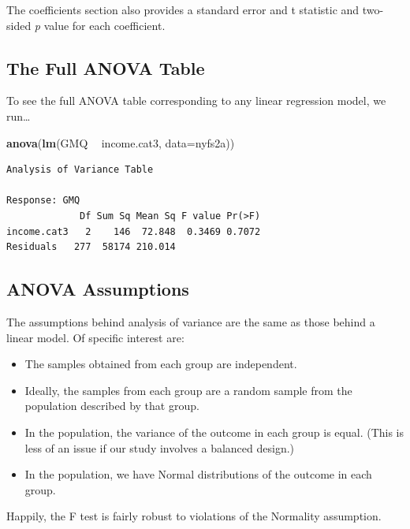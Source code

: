\documentclass[
]{book}
\newenvironment{Shaded}{\begin{snugshade}}{\end{snugshade}}
\newcommand{\DataTypeTok}[1]{\textcolor[rgb]{0.13,0.29,0.53}{#1}}
\newcommand{\KeywordTok}[1]{\textcolor[rgb]{0.13,0.29,0.53}{\textbf{#1}}}
\newcommand{\NormalTok}[1]{#1}
\newcommand{\OperatorTok}[1]{\textcolor[rgb]{0.81,0.36,0.00}{\textbf{#1}}}
\newcommand{\StringTok}[1]{\textcolor[rgb]{0.31,0.60,0.02}{#1}}
\providecommand{\tightlist}{%
  \setlength{\itemsep}{0pt}\setlength{\parskip}{0pt}}
\begin{document}
The coefficients section also provides a standard error and t statistic and two-sided \emph{p} value for each coefficient.

\hypertarget{the-full-anova-table}{%
\subsection{The Full ANOVA Table}\label{the-full-anova-table}}

To see the full ANOVA table corresponding to any linear regression model, we run\ldots{}

\begin{Shaded}
\begin{Highlighting}[]
\KeywordTok{anova}\NormalTok{(}\KeywordTok{lm}\NormalTok{(GMQ }\OperatorTok{~}\StringTok{ }\NormalTok{income.cat3, }\DataTypeTok{data=}\NormalTok{nyfs2a))}
\end{Highlighting}
\end{Shaded}

\begin{verbatim}
Analysis of Variance Table

Response: GMQ
             Df Sum Sq Mean Sq F value Pr(>F)
income.cat3   2    146  72.848  0.3469 0.7072
Residuals   277  58174 210.014               
\end{verbatim}

\hypertarget{anova-assumptions}{%
\subsection{ANOVA Assumptions}\label{anova-assumptions}}

The assumptions behind analysis of variance are the same as those behind a linear model. Of specific interest are:

\begin{itemize}
\tightlist
\item
  The samples obtained from each group are independent.
\item
  Ideally, the samples from each group are a random sample from the population described by that group.
\item
  In the population, the variance of the outcome in each group is equal. (This is less of an issue if our study involves a balanced design.)
\item
  In the population, we have Normal distributions of the outcome in each group.
\end{itemize}

Happily, the F test is fairly robust to violations of the Normality assumption.
\end{document}
